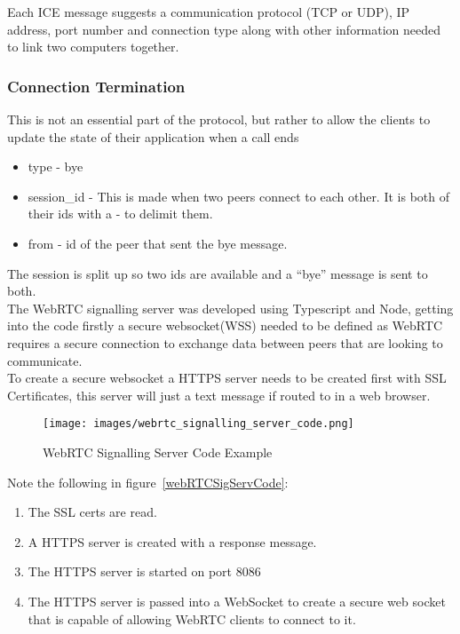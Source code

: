 Each ICE message suggests a communication protocol (TCP or UDP), IP address, port number and connection type along with other information needed to link two computers together.

\subsubsection {Connection Termination}
This is not an essential part of the protocol, but rather to allow the clients to update the state of their application when a call ends
\begin{itemize}
    \item type - bye
    \item session\_id - This is made when two peers connect to each other. It is both of their ids with a - to delimit them.
    \item from - id of the peer that sent the bye message.
\end{itemize}

The session is split up so two ids are available and a “bye” message is sent to both.
\\ The WebRTC signalling server was developed using Typescript and Node, getting into the code firstly a secure websocket(WSS) needed to be defined as WebRTC requires a secure connection to exchange data between peers that are looking to communicate. 
\\ To create a secure websocket a HTTPS server needs to be created first with SSL
Certificates, this server will just a text message if routed to in a web browser. 

\begin{figure}[h!]
    \caption{WebRTC Signalling Server Code Example}
    \label{image:webRTCSigServCode}
    \centering
    \texttt{[image: images/webrtc\_signalling\_server\_code.png]}
\end{figure}

Note the following in figure~\ref{webRTCSigServCode}:
\begin{enumerate}
    \item The SSL certs are read.
    \item A HTTPS server is created with a response message.
    \item The HTTPS server is started on port 8086
    \item The HTTPS server is passed into a WebSocket to create a secure web socket that is capable of allowing WebRTC clients to connect to it.
\end{enumerate}

